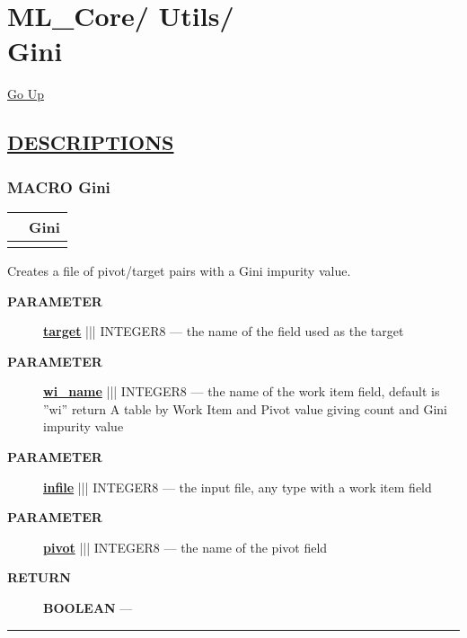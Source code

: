 \chapter*{\color{headfile}
{\large ML\_Core\slash\hspace{0pt}}
{\large Utils\slash\hspace{0pt}}
 \\
Gini
}
\hypertarget{ecldoc:toc:ML_Core.Utils.Gini}{}
\hyperlink{ecldoc:toc:root/ML_Core/Utils}{Go Up}


\section*{\underline{\textsf{DESCRIPTIONS}}}
\subsection*{\textsf{\colorbox{headtoc}{\color{white} MACRO}
Gini}}

\hypertarget{ecldoc:ml_core.utils.gini}{}

{\renewcommand{\arraystretch}{1.5}
\begin{tabularx}{\textwidth}{|>{\raggedright\arraybackslash}l|X|}
\hline
\hspace{0pt}\mytexttt{\color{red} } & \textbf{Gini} \\
\hline
\multicolumn{2}{|>{\raggedright\arraybackslash}X|}{\hspace{0pt}\mytexttt{\color{param} (infile, pivot, target, wi\_name='wi')}} \\
\hline
\end{tabularx}
}

\par





Creates a file of pivot/target pairs with a Gini impurity value.






\par
\begin{description}
\item [\colorbox{tagtype}{\color{white} \textbf{\textsf{PARAMETER}}}] \textbf{\underline{target}} ||| INTEGER8 --- the name of the field used as the target
\item [\colorbox{tagtype}{\color{white} \textbf{\textsf{PARAMETER}}}] \textbf{\underline{wi\_name}} ||| INTEGER8 --- the name of the work item field, default is ''wi'' return A table by Work Item and Pivot value giving count and Gini impurity value
\item [\colorbox{tagtype}{\color{white} \textbf{\textsf{PARAMETER}}}] \textbf{\underline{infile}} ||| INTEGER8 --- the input file, any type with a work item field
\item [\colorbox{tagtype}{\color{white} \textbf{\textsf{PARAMETER}}}] \textbf{\underline{pivot}} ||| INTEGER8 --- the name of the pivot field
\end{description}







\par
\begin{description}
\item [\colorbox{tagtype}{\color{white} \textbf{\textsf{RETURN}}}] \textbf{BOOLEAN} --- 
\end{description}




\rule{\linewidth}{0.5pt}
